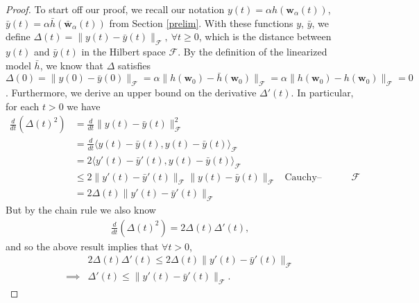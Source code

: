 \documentclass{article}
\begin{document}
\begin{proof}
To start off our proof, we recall our notation $y(t) = \alpha h(\boldsymbol{w}_{\alpha}(t))$, $\bar{y}(t) = \alpha \bar{h}(\boldsymbol{\bar{w}}_{\alpha}(t))$ from Section \ref{prelim}. With these functions $y$, $\bar{y}$, we define $\Delta(t) = \| y(t) - \bar{y}(t) \|_{\mathcal{F}}, \ \forall t \geq 0$, which is the distance between $y(t)$ and $\bar{y}(t)$ in the Hilbert space $\mathcal{F}$. By the definition of the linearized model $\bar{h}$, we know that $\Delta$ satisfies $\Delta(0) = \| y(0) - \bar{y}(0) \|_{\mathcal{F}} = \alpha  \| h(\boldsymbol{w}_0) - \bar{h}(\boldsymbol{w}_0) \|_{\mathcal{F}} = \alpha \| h(\boldsymbol{w}_0) - h(\boldsymbol{w}_0) \|_{\mathcal{F}} = 0$. Furthermore, we derive an upper bound on the derivative $\Delta'(t)$. In particular, for each $t > 0$ we have
\begin{align*}
    \frac{d}{dt} \left( \Delta(t)^2 \right)&= \frac{d}{dt}\| y(t) - \bar{y}(t) \|_{\mathcal{F}}^2\\
    &= \frac{d}{dt} \langle y(t) - \bar{y}(t), y(t) - \bar{y}(t) \rangle_{\mathcal{F}}\\
    &= 2\langle y'(t) - \bar{y}'(t), y(t) - \bar{y}(t) \rangle_{\mathcal{F}}\\
    &\leq 2 \| y'(t) - \bar{y}'(t) \|_{\mathcal{F}} \|y(t) - \bar{y}(t) \|_{\mathcal{F}} & \text{Cauchy–Schwarz in $\mathcal{F}$}\\
    &= 2 \Delta(t) \| y'(t) - \bar{y}'(t) \|_{\mathcal{F}}
\end{align*}
But by the chain rule we also know
\begin{align*}
    \frac{d}{dt}(\Delta(t)^2) =  2 \Delta(t) \Delta'(t),
\end{align*}
and so the above result implies that $\forall t > 0$,
\begin{align*}
    &2 \Delta(t) \Delta'(t) \leq 2 \Delta(t) \| y'(t) - \bar{y}'(t) \|_{\mathcal{F}}\\
    \implies& \Delta'(t) \leq \| y'(t) - \bar{y}'(t) \|_{\mathcal{F}}.
\end{align*}


\end{proof}
\end{document}

